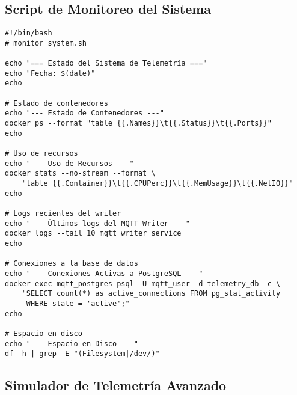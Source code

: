 \subsection{Script de Monitoreo del Sistema}

\begin{verbatim}
#!/bin/bash
# monitor_system.sh

echo "=== Estado del Sistema de Telemetría ==="
echo "Fecha: $(date)"
echo

# Estado de contenedores
echo "--- Estado de Contenedores ---"
docker ps --format "table {{.Names}}\t{{.Status}}\t{{.Ports}}"
echo

# Uso de recursos
echo "--- Uso de Recursos ---"
docker stats --no-stream --format \
    "table {{.Container}}\t{{.CPUPerc}}\t{{.MemUsage}}\t{{.NetIO}}"
echo

# Logs recientes del writer
echo "--- Últimos logs del MQTT Writer ---"
docker logs --tail 10 mqtt_writer_service
echo

# Conexiones a la base de datos
echo "--- Conexiones Activas a PostgreSQL ---"
docker exec mqtt_postgres psql -U mqtt_user -d telemetry_db -c \
    "SELECT count(*) as active_connections FROM pg_stat_activity 
     WHERE state = 'active';"
echo

# Espacio en disco
echo "--- Espacio en Disco ---"
df -h | grep -E "(Filesystem|/dev/)"
\end{verbatim}

\subsection{Simulador de Telemetría Avanzado}

